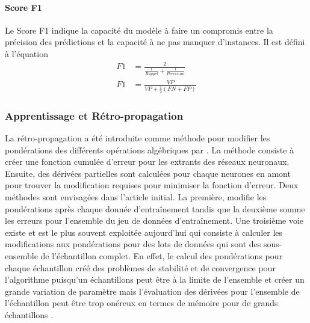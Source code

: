       \paragraph{Score F1} Le Score F1 indique la capacité du modèle à faire un compromis entre la précision des prédictions et la capacité à ne pas manquer d'instances. Il est défini à l'équation 
      \begin{align}
        F1 & = \frac{2}{\frac{1}{Rappel} + \frac{1}{Precision}}\label{eq:F1_1}\\
        F1 & = \frac{VP}{VP + \frac{1}{2} (FN + FP)}
      \end{align}
    \subsubsection{Apprentissage et Rétro-propagation}
      La rétro-propagation a été introduite comme méthode pour modifier les pondérations des différents opérations algébriques par \textcite{rumelhart_learning_1986}. La méthode consiste à créer une fonction cumulée d'erreur pour les extrants des réseaux neuronaux. Ensuite, des dérivées partielles sont calculées pour chaque neurones en amont pour trouver la modification requises pour minimiser la fonction d'erreur. Deux méthodes sont envisagées dans l'article initial. La première, modifie les pondérations après chaque donnée d’entraînement tandis que la deuxième somme les erreurs pour l'ensemble du jeu de données d’entraînement. Une troisième voie existe et est le plus souvent exploitée aujourd'hui qui consiste à calculer les modifications aux pondérations pour des lots de données qui sont des sous-ensemble de l'échantillon complet. En effet, le calcul des pondérations pour chaque échantillon créé des problèmes de stabilité et de convergence pour l'algorithme puisqu'un échantillons peut être à la limite de l'ensemble et créer un grande variation de paramètre mais l'évaluation des dérivées pour l'ensemble de l'échantillon peut être trop onéreux en termes de mémoire pour de grands échantillons \parencite{wallach_deep_2024}.\par
      
